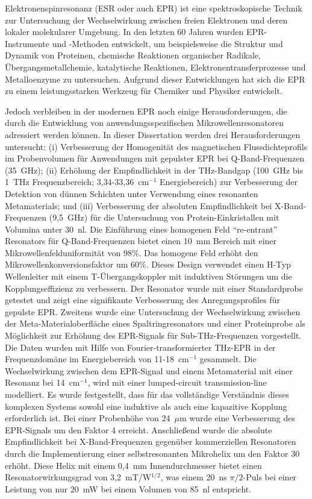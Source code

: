 \vspace{-2em}
Elektronenspinresonanz (ESR oder auch EPR) ist eine spektroskopische Technik zur Untersuchung der Wechselwirkung zwischen freien Elektronen und deren lokaler molekularer Umgebung. In den letzten 60 Jahren wurden EPR-Instrumente und -Methoden entwickelt, um beispielsweise die Struktur und Dynamik von Proteinen, chemische Reaktionen organischer Radikale, Übergangsmetallchemie, katalytische Reaktionen, Elektronentransferprozesse und Metalloenzyme zu untersuchen. Aufgrund dieser Entwicklungen hat sich die EPR zu einem leistungsstarken Werkzeug für Chemiker und Physiker entwickelt.

Jedoch verbleiben in der modernen EPR noch einige Herausforderungen, die durch die Entwicklung von anwendungsspezifischen Mikrowellenresonatoren adressiert werden können. In dieser Dissertation werden drei Herausforderungen untersucht: (i) Verbesserung der Homogenität des magnetischen Flussdichteprofils im Probenvolumen für Anwendungen mit gepulster EPR bei Q-Band-Frequenzen (35~GHz); (ii) Erhöhung der Empfindlichkeit in der THz-Bandgap (100~GHz bis 1~THz Frequenzbereich; 3{,}34-33{,}36~cm$^{-1}$ Energiebereich) zur Verbesserung der Detektion von dünnen Schichten unter Verwendung eines resonanten Metamaterials; und (iii) Verbesserung der absoluten Empfindlichkeit bei X-Band-Frequenzen (9{,}5~GHz) für die Untersuchung von Protein-Einkristallen mit Volumina unter 30~nl. Die Einführung eines homogenen Feld ``re-entrant'' \cylTE{} Resonators für Q-Band-Frequenzen bietet einen 10~mm Bereich mit einer Mikrowellenfelduniformität von 98\%. Das homogene Feld erhöht den Mikrowellenkonversionsfaktor um 60\%. Dieses Design verwendet einen H-Typ Wellenleiter mit einem T-Übergangskoppler mit induktiven St\"{o}rungen um die Kopplungseffizienz zu verbessern. Der Resonator wurde mit einer Standardprobe getestet und zeigt eine signifikante Verbesserung des Anregungsprofiles für gepulste EPR. Zweitens wurde eine Untersuchung der Wechselwirkung zwischen der Meta-Materialoberfläche eines Spaltringresonators und einer Proteinprobe als Möglichkeit zur Erhöhung des EPR-Signals für Sub-THz-Frequenzen vorgestellt. Die Daten wurden mit Hilfe von Fourier-transformierter THz-EPR in der Frequenzdomäne im Energiebereich von 11-18~cm$^{-1}$ gesammelt.  Die Wechselwirkung zwischen dem EPR-Signal und einem Metamaterial mit einer Resonanz bei 14~cm$^{-1}$, wird mit einer lumped-circuit transmission-line modelliert. Es wurde festgestellt, dass für das vollständige Verständnis dieses komplexen Systems sowohl eine induktive als auch eine kapazitive Kopplung erforderlich ist. Bei einer Probenhöhe von 24~$\mu$m wurde eine Verbesserung des EPR-Signals um den Faktor 4 erreicht. Anschließend wurde die absolute Empfindlichkeit bei X-Band-Frequenzen gegenüber kommerziellen Resonatoren durch die Implementierung einer selbstresonanten Mikrohelix um den Faktor 30 erhöht. Diese Helix mit einem 0{,}4~mm Innendurchmesser bietet einen Resonatorwirkungsgrad von 3{,}2~mT/W$^{1/2}$, was einem 20~ns $\pi/2$-Puls bei einer Leistung von nur 20~mW bei einem Volumen von 85~nl entspricht. %
